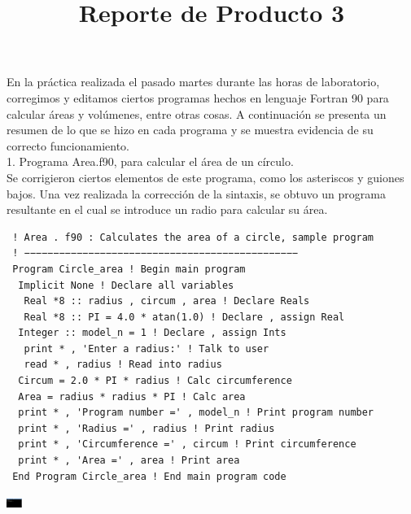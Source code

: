 \documentclass[12pt]{article}
\title{ Reporte de Producto 3}
\date{}
\begin{document}
  \maketitle
  En la práctica realizada el pasado martes durante las horas de laboratorio, corregimos y editamos ciertos programas hechos en lenguaje Fortran 90 para calcular áreas y volúmenes, entre otras cosas.
  A continuación se presenta un resumen de lo que se hizo en cada programa y se muestra evidencia de su correcto funcionamiento.\\
  
  1.  Programa Area.f90, para calcular el área de un círculo.\\
  Se corrigieron ciertos elementos de este programa, como los asteriscos y guiones bajos. Una vez realizada la corrección de la sintaxis, se obtuvo un programa resultante en el cual se introduce un radio para calcular su área.\\
\begin{verbatim}
 ! Area . f90 : Calculates the area of a circle, sample program
 ! −−−−−−−−−−−−−−−−−−−−−−−−−−−−−−−−−−−−−−−−−−−−−−−
 Program Circle_area ! Begin main program
  Implicit None ! Declare all variables
   Real *8 :: radius , circum , area ! Declare Reals
   Real *8 :: PI = 4.0 * atan(1.0) ! Declare , assign Real
  Integer :: model_n = 1 ! Declare , assign Ints
   print * , 'Enter a radius:' ! Talk to user
   read * , radius ! Read into radius
  Circum = 2.0 * PI * radius ! Calc circumference
  Area = radius * radius * PI ! Calc area
  print * , 'Program number =' , model_n ! Print program number
  print * , 'Radius =' , radius ! Print radius
  print * , 'Circumference =' , circum ! Print circumference
  print * , 'Area =' , area ! Print area
 End Program Circle_area ! End main program code
\end{verbatim}
 \begin{center}
\includegraphics[width=0.5cm]{Area.png}\\
 \end{center}
  
\end{document}

